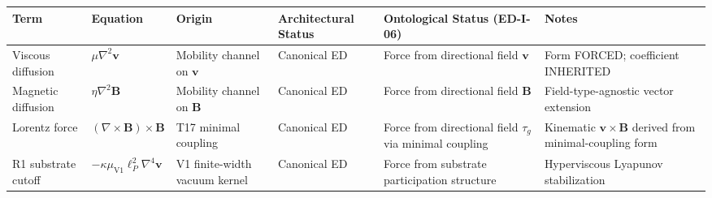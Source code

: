 \documentclass[
  11pt,a4paper]{article}
\newcounter{none} %
\begin{document}
{\def\LTcaptype{none} %
\begin{longtable}[]{@{}
  >{\raggedright\arraybackslash}p{}
  >{\raggedright\arraybackslash}p{}
  >{\raggedright\arraybackslash}p{}
  >{\raggedright\arraybackslash}p{}
  >{\raggedright\arraybackslash}p{}
  >{\raggedright\arraybackslash}p{}@{}}
\toprule\noalign{}
\begin{minipage}[b]{\linewidth}\raggedright
Term
\end{minipage} & \begin{minipage}[b]{\linewidth}\raggedright
Equation
\end{minipage} & \begin{minipage}[b]{\linewidth}\raggedright
Origin
\end{minipage} & \begin{minipage}[b]{\linewidth}\raggedright
Architectural Status
\end{minipage} & \begin{minipage}[b]{\linewidth}\raggedright
Ontological Status (ED-I-06)
\end{minipage} & \begin{minipage}[b]{\linewidth}\raggedright
Notes
\end{minipage} \\
\midrule\noalign{}
\endhead
\bottomrule\noalign{}
\endlastfoot
Viscous diffusion & \(\mu\nabla^2\mathbf{v}\) & Mobility channel on
\(\mathbf{v}\) & Canonical ED & Force from directional field
\(\mathbf{v}\) & Form FORCED; coefficient INHERITED \\
Magnetic diffusion & \(\eta\nabla^2\mathbf{B}\) & Mobility channel on
\(\mathbf{B}\) & Canonical ED & Force from directional field
\(\mathbf{B}\) & Field-type-agnostic vector extension \\
Lorentz force & \((\nabla\times\mathbf{B})\times\mathbf{B}\) & T17
minimal coupling & Canonical ED & Force from directional field
\(\tau_g\) via minimal coupling & Kinematic
\(\mathbf{v}\times\mathbf{B}\) derived from minimal-coupling form \\
R1 substrate cutoff &
\(-\kappa\mu_\mathrm{V1}\ell_P^2\nabla^4\mathbf{v}\) & V1 finite-width
vacuum kernel & Canonical ED & Force from substrate participation
structure & Hyperviscous Lyapunov stabilization \\

\end{longtable}}
\end{document}
